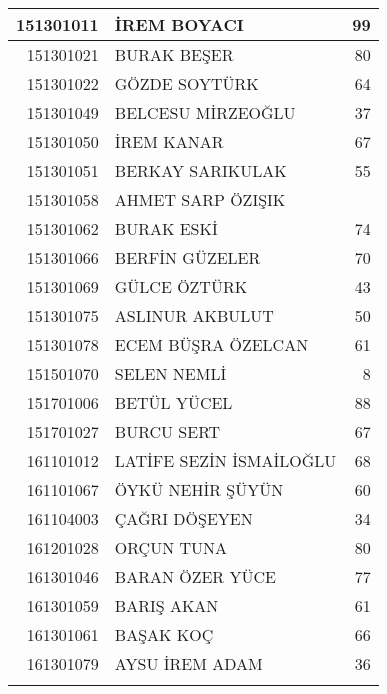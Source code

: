\documentclass[12pt]{article}
\begin{document}
\begin{longtable}{||r||l||r||}
    \midrule
    151301011 & İREM BOYACI & 99 \\
    \midrule
    151301021 & BURAK BEŞER & 80 \\
    \midrule
    151301022 & GÖZDE SOYTÜRK & 64 \\
    \midrule
    151301049 & BELCESU MİRZEOĞLU & 37 \\
    \midrule
    151301050 & İREM KANAR & 67 \\
    \midrule
    151301051 & BERKAY SARIKULAK & 55 \\
    \midrule
    151301058 & AHMET SARP ÖZIŞIK &  \\
    \midrule
    151301062 & BURAK ESKİ & 74 \\
    \midrule
    151301066 & BERFİN GÜZELER & 70 \\
    \midrule
    151301069 & GÜLCE ÖZTÜRK & 43 \\
    \midrule
    151301075 & ASLINUR AKBULUT & 50 \\
    \midrule
    151301078 & ECEM BÜŞRA ÖZELCAN & 61 \\
    \midrule
    151501070 & SELEN NEMLİ & 8 \\
    \midrule
    151701006 & BETÜL YÜCEL & 88 \\
    \midrule
    151701027 & BURCU SERT & \cellcolor[rgb]{ 1,  1,  0} 67 \\
    \midrule
    161101012 & LATİFE SEZİN İSMAİLOĞLU & 68 \\
    \midrule
    161101067 & ÖYKÜ NEHİR ŞÜYÜN & 60 \\
    \midrule
    161104003 & ÇAĞRI DÖŞEYEN & 34 \\
    \midrule
    161201028 & ORÇUN TUNA & 80 \\
    \midrule
    161301046 & BARAN ÖZER YÜCE & \cellcolor[rgb]{ 1,  1,  0} 77 \\
    \midrule
    161301059 & BARIŞ AKAN & 61 \\
    \midrule
    161301061 & BAŞAK KOÇ & 66 \\
    \midrule
    161301079 & AYSU İREM ADAM & 36 \\
    \bottomrule
    \bottomrule  \label{tab:addlabel}%
    \end{longtable}%
\end{document}
